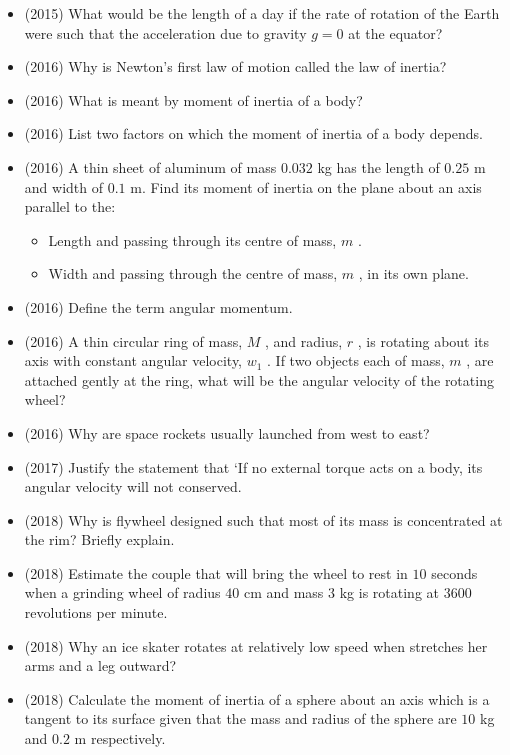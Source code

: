 \documentclass{article}
\begin{document}
\begin{itemize}
\begin{itemize}
\end{itemize}
\item (2015)  What would be the length of a day if the rate of rotation of the Earth were such that the acceleration due to gravity $ g=0$ at the equator?
\item (2016)  Why is Newton’s first law of motion called the law of inertia?
\item (2016)  What is meant by moment of inertia of a body?
\item (2016)  List two factors on which the moment of inertia of a body depends. 
\item (2016)  A thin sheet of aluminum of mass $ 0.032$ kg has the length of $ 0.25$ m and width of $ 0.1$ m. Find its moment of inertia on the plane about an axis parallel to the:\begin{itemize}
\item Length and passing through its centre of mass, $ m$ .
\item Width and passing through the centre of mass, $ m$ , in its own plane.
\end{itemize}
\item (2016)  Define the term angular momentum.
\item (2016)  A thin circular ring of mass, $ M$ , and radius, $ r$ , is rotating about its axis with constant angular velocity, $ w_{1}$ .  If two objects each of mass, $ m$ , are attached gently at the ring, what will be the angular velocity of the rotating wheel?
\item (2016)  Why are space rockets usually launched from west to east?
\item (2017)  Justify the statement that ‘If no external torque acts on a body, its angular velocity will not conserved.
\item (2018)  Why is flywheel designed such that most of its mass is concentrated at the rim? Briefly explain. 
\item (2018)  Estimate the couple that will bring the wheel to rest in $ 10$ seconds when a grinding wheel of radius $ 40$ cm and mass $ 3$ kg is rotating at $ 3600$ revolutions per minute. 
\item (2018)  Why an ice skater rotates at relatively low speed when stretches her arms and a leg outward? 
\item (2018)  Calculate the moment of inertia of a sphere about an axis which is a tangent to its surface given that the mass and radius of the sphere are $ 10$ kg and $ 0.2$ m respectively. 
\end{itemize}
\end{document}
